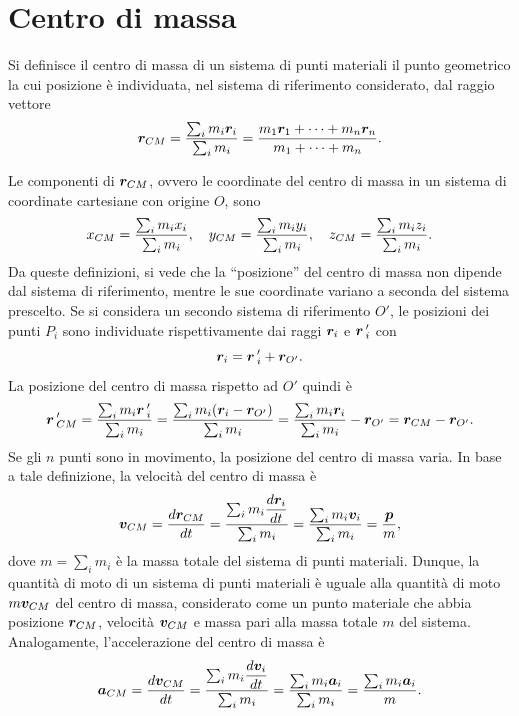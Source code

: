 \section{Centro di massa}
\begin{defn}
    Si definisce il centro di massa di un sistema di punti materiali il punto geometrico la cui posizione è individuata, nel sistema di riferimento considerato, dal raggio vettore
    \begin{equation}
        \bm{r}_{CM}=\frac{\sum_im_i\bm{r}_i}{\sum_im_i}=\frac{m_1\bm{r}_1+\cdots+m_n\bm{r}_n}{m_1+\cdots+m_n}.
    \end{equation}
\end{defn}
Le componenti di $\bm{r}_{CM}$, ovvero le coordinate del centro di massa in un sistema di coordinate cartesiane con origine $O$, sono
\begin{equation}
    x_{CM}=\frac{\sum_im_ix_i}{\sum_im_i},\quad y_{CM}=\frac{\sum_im_iy_i}{\sum_im_i},\quad z_{CM}=\frac{\sum_im_iz_i}{\sum_im_i}.
\end{equation}
Da queste definizioni, si vede che la ``posizione'' del centro di massa non dipende dal sistema di riferimento, mentre le sue coordinate variano a seconda del sistema prescelto. Se si considera un secondo sistema di riferimento $O'$, le posizioni dei punti $P_i$ sono individuate rispettivamente dai raggi $\bm{r}_i$ e $\bm{r}\,'_i$ con
\begin{equation}
    \bm{r}_i=\bm{r}\,'_i+\bm{r}_{O'}.
\end{equation}
La posizione del centro di massa rispetto ad $O'$ quindi è
\begin{equation}
    \bm{r}\,'_{CM}=\frac{\sum_im_i\bm{r}\,'_i}{\sum_im_i}=\frac{\sum_im_i(\bm{r}_i-\bm{r}_{O'})}{\sum_im_i}=\frac{\sum_im_i\bm{r}_i}{\sum_im_i}-\bm{r}_{O'}=\bm{r}_{CM}-\bm{r}_{O'}.
\end{equation}
Se gli $n$ punti sono in movimento, la posizione del centro di massa varia. In base a tale definizione, la velocità del centro di massa è
\begin{equation}
    \bm{v}_{CM}=\frac{d\bm{r}_{CM}}{dt}=\frac{\sum_im_i\dfrac{d\bm{r}_i}{dt}}{\sum_im_i}=\frac{\sum_im_i\bm{v}_i}{\sum_im_i}=\frac{\bm{p}}{m},
\end{equation}
dove $m=\sum_im_i$ è la massa totale del sistema di punti materiali. Dunque, la quantità di moto di un sistema di punti materiali è uguale alla quantità di moto $m\bm{v}_{CM}$ del centro di massa, considerato come un punto materiale che abbia  posizione $\bm{r}_{CM}$, velocità $\bm{v}_{CM}$ e massa pari alla massa totale $m$ del sistema. Analogamente, l'accelerazione del centro di massa è
\begin{equation}
    \bm{a}_{CM}=\frac{d\bm{v}_{CM}}{dt}=\frac{\sum_im_i\dfrac{d\bm{v}_i}{dt}}{\sum_im_i}=\frac{\sum_im_i\bm{a}_i}{\sum_im_i}=\frac{\sum_im_i\bm{a}_i}{m}.
\end{equation}
